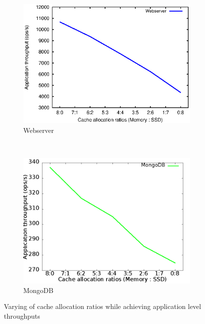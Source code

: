 	\begin{figure}[t!]
	  \centering
	  \begin{subfigure}[t]{0.49\textwidth}
	    \centering
	    \includegraphics[width=1\textwidth]{images/dd_hybrid_eval/webserver.eps}
	    \caption{Webserver}
	    \label{img:webserver_th}
	  \end{subfigure}
	  ~ 
	  \begin{subfigure}[t]{0.48\textwidth}
	    \centering
	    \includegraphics[width=1\textwidth]{images/dd_hybrid_eval/throughput.png}
	    \caption{MongoDB}
	    \label{img:mongo_th}
	  \end{subfigure}
	  \caption{Varying of cache allocation ratios while achieving application level throughputs}
	\end{figure}
	
